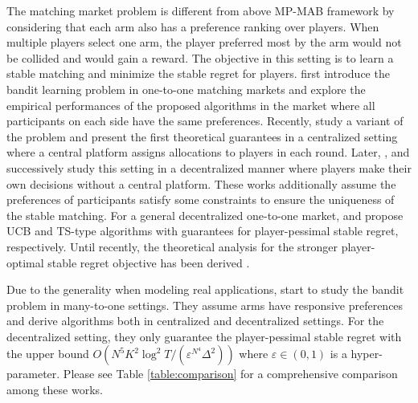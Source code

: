 The matching market problem is different from above MP-MAB framework by considering that each arm also has a preference ranking over players.  
When multiple players select one arm, the player preferred most by the arm would not be collided and would gain a reward.   
The objective in this setting is to learn a stable matching and minimize the stable regret for players. 
\citet{das2005two} first introduce the bandit learning problem in one-to-one matching markets and explore the empirical performances of the proposed algorithms in the market where all participants on each side have the same preferences. 
Recently, \citet{liu2020competing} study a variant of the problem and present the first theoretical guarantees in a centralized setting where a central platform assigns allocations to players in each round. 
Later,  \citet{sankararaman2021dominate}, \citet{basu21beyond} and \citet{maheshwari2022decentralized} successively study this setting in a decentralized manner where players make their own decisions without a central platform. 
These works additionally assume the preferences of participants satisfy some constraints to ensure the uniqueness of the stable matching.  
For a general decentralized one-to-one market, \citet{liu2021bandit} and \citet{kong2022thompson} propose UCB and TS-type algorithms with guarantees for player-pessimal stable regret, respectively. 
Until recently, the theoretical analysis for the stronger player-optimal stable regret objective has been derived \citep{zhang2022matching,kong2023player}. 

Due to the generality when modeling real applications, \citet{wang2022bandit} start to study the bandit problem in many-to-one settings. They assume arms have responsive preferences and derive algorithms both in centralized and decentralized settings. For the decentralized setting, they only guarantee the player-pessimal stable regret with the upper bound $O(N^5K^2\log^2 T/(\varepsilon^{N^4}\Delta^2))$ where $\varepsilon\in(0,1)$ is a hyper-parameter. 
Please see Table \ref{table:comparison} for a comprehensive comparison among these works. 


